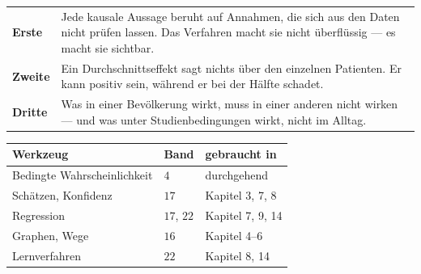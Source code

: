 \begin{warnung}
\begin{center}
{\small
\renewcommand{\arraystretch}{1.55}
\begin{tabular}{@{}P{2.2cm}P{6.4cm}@{}}
\toprule
\textbf{Erste} & Jede kausale Aussage beruht auf Annahmen, die sich aus den Daten nicht prüfen lassen. Das Verfahren macht sie nicht überflüssig --- es macht sie sichtbar.\\
\textbf{Zweite} & Ein Durchschnittseffekt sagt nichts über den einzelnen Patienten. Er kann positiv sein, während er bei der Hälfte schadet.\\
\textbf{Dritte} & Was in einer Bevölkerung wirkt, muss in einer anderen nicht wirken --- und was unter Studienbedingungen wirkt, nicht im Alltag.\\
\bottomrule
\end{tabular}}
\end{center}

\begin{center}
\begin{minipage}{0.88\textwidth}
\end{minipage}
\end{center}
\end{warnung}

\begin{merksatz}
\begin{center}
{\small
\renewcommand{\arraystretch}{1.48}
\begin{tabular}{@{}P{3.0cm}P{1.6cm}P{3.0cm}@{}}
\toprule
\textbf{Werkzeug} & \textbf{Band} & \textbf{gebraucht in}\\
\midrule
Bedingte Wahrscheinlichkeit & $4$ & durchgehend\\
Schätzen, Konfidenz & $17$ & Kapitel 3, 7, 8\\
Regression & $17$, $22$ & Kapitel 7, 9, 14\\
Graphen, Wege & $16$ & Kapitel 4--6\\
Lernverfahren & $22$ & Kapitel 8, 14\\
\bottomrule
\end{tabular}}
\end{center}

\begin{center}
\begin{minipage}{0.88\textwidth}
\end{minipage}
\end{center}
\end{merksatz}

